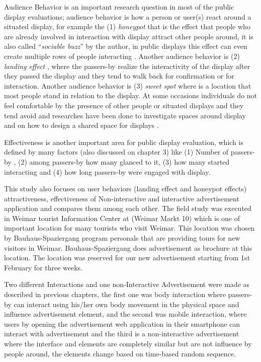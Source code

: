 Audience Behavior is an important research question in most of the public display evaluations; audience behavior is how a person or user(s) react around a situated display, for example the (1) \emph{honeypot} \cite{EnticingPeople} that is the effect that people who are already involved in interaction with display attract other people around, it is also called ``\emph{sociable buzz}'' by the author, in public displays this effect can even create multiple rows of people interacting \cite{LookingGlass}. Another audience behavior is (2) \emph{landing effect} \cite{LookingGlass}, where the passers-by realize the interactivity of the display after they passed the display and they tend to walk back for confirmation or for interaction. Another audience behavior is (3) \emph {sweet spot} \cite{CylindricalScreen} where is a location that most people stand in relation to the display. At some occasions individuals do not feel comfortable by the presence of other people or situated displays and they tend avoid \cite{DesignSpace} and researches have been done to investigate spaces around display and on how to design a shared space for displays \cite{chained_displays}.

Effectiveness is another important area for public display evaluation, which is defined by many factors (also discussed on chapter 3) like (1) Number of passers-by \cite{glancingcount, digitalSignage}, (2) among passers-by how many glanced \cite{glancingcount, When_display, display_blindness} to it, (3) how many started interacting \cite{LookingGlass, glancingcount} and (4) how long passers-by were engaged with display.


This study also focuses on user behaviors (landing effect and honeypot effects) attractiveness, effectiveness of Non-interactive and interactive advertisement application and compares them among each other. The field study was executed in Weimar tourist Information Center at (Weimar Markt 10) which is one of important location for many tourists who visit Weimar. This location was chosen by Bauhaus-Spaziergang program personals that are providing tours for new visitors in Weimar. Bauhaus-Spaziergang does advertisement as brochure at this location. The location was reserved for our new advertisement starting from 1st February for three weeks.  

Two different Interactions and one non-Interactive Advertisement were made as described in previous chapters, the first one was body interaction where passers-by can interact using his/her own body movement in the physical space and influence advertisement element, and the second was mobile interaction, where users by opening the advertisement web application in their smartphone can interact with advertisement and the third is a non-interactive advertisement where the interface and elements are completely similar but are not influence by people around, the elements change based on time-based random sequence.



